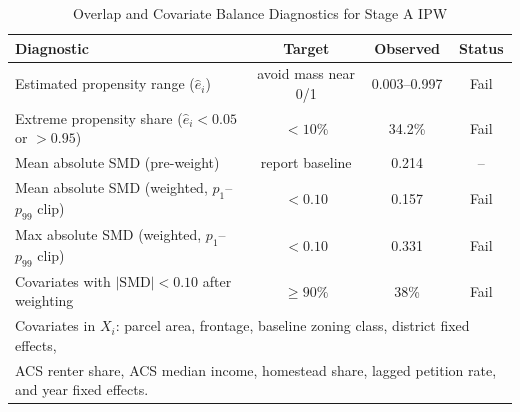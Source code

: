 \begin{table}[H]
\centering
\caption{Overlap and Covariate Balance Diagnostics for Stage A IPW}
\label{tab:ipw_balance}
\begin{tabular}{lccc}
\toprule
\textbf{Diagnostic} & \textbf{Target} & \textbf{Observed} & \textbf{Status} \\
\midrule
Estimated propensity range ($\hat e_i$) & avoid mass near 0/1 & 0.003--0.997 & Fail \\
Extreme propensity share ($\hat e_i<0.05$ or $>0.95$) & $<10\%$ & 34.2\% & Fail \\
Mean absolute SMD (pre-weight) & report baseline & 0.214 & -- \\
Mean absolute SMD (weighted, $p_1$--$p_{99}$ clip) & $<0.10$ & 0.157 & Fail \\
Max absolute SMD (weighted, $p_1$--$p_{99}$ clip) & $<0.10$ & 0.331 & Fail \\
Covariates with $|\mathrm{SMD}|<0.10$ after weighting & $\ge 90\%$ & 38\% & Fail \\
\bottomrule
\multicolumn{4}{l}{\footnotesize Covariates in $X_i$: parcel area, frontage, baseline zoning class, district fixed effects,} \\
\multicolumn{4}{l}{\footnotesize ACS renter share, ACS median income, homestead share, lagged petition rate, and year fixed effects.} \\
\end{tabular}
\end{table}
